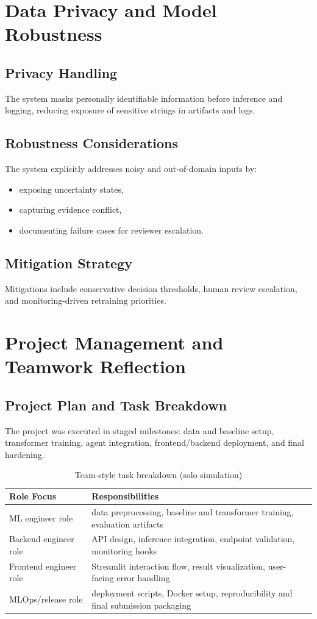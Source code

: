 \documentclass[11pt,a4paper]{article}
\begin{document}
\section{Data Privacy and Model Robustness}
\subsection{Privacy Handling}
The system masks personally identifiable information before inference and logging, reducing exposure of sensitive strings in artifacts and logs.

\subsection{Robustness Considerations}
The system explicitly addresses noisy and out-of-domain inputs by:
\begin{itemize}[leftmargin=1.2em]
  \item exposing uncertainty states,
  \item capturing evidence conflict,
  \item documenting failure cases for reviewer escalation.
\end{itemize}

\subsection{Mitigation Strategy}
Mitigations include conservative decision thresholds, human review escalation, and monitoring-driven retraining priorities.

\section{Project Management and Teamwork Reflection}
\subsection{Project Plan and Task Breakdown}
The project was executed in staged milestones: data and baseline setup, transformer training, agent integration, frontend/backend deployment, and final hardening.

\begin{table}[H]
\centering
\caption{Team-style task breakdown (solo simulation)}
\label{tab:team-breakdown}
\begin{tabularx}{\textwidth}{lX}
\toprule
Role Focus & Responsibilities \\
\midrule
ML engineer role & data preprocessing, baseline and transformer training, evaluation artifacts \\
Backend engineer role & API design, inference integration, endpoint validation, monitoring hooks \\
Frontend engineer role & Streamlit interaction flow, result visualization, user-facing error handling \\
MLOps/release role & deployment scripts, Docker setup, reproducibility and final submission packaging \\
\bottomrule
\end{tabularx}
\end{table}
\end{document}
